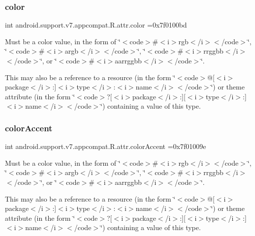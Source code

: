 \subsubsection{\texorpdfstring{color}{color}}
{\footnotesize\ttfamily int android.\+support.\+v7.\+appcompat.\+R.\+attr.\+color =0x7f0100bd\hspace{0.3cm}{\ttfamily [static]}}

Must be a color value, in the form of \char`\"{}$<$code$>$\#$<$i$>$rgb$<$/i$>$$<$/code$>$\char`\"{}, \char`\"{}$<$code$>$\#$<$i$>$argb$<$/i$>$$<$/code$>$\char`\"{}, \char`\"{}$<$code$>$\#$<$i$>$rrggbb$<$/i$>$$<$/code$>$\char`\"{}, or \char`\"{}$<$code$>$\#$<$i$>$aarrggbb$<$/i$>$$<$/code$>$\char`\"{}. 

This may also be a reference to a resource (in the form \char`\"{}$<$code$>$@\mbox{[}$<$i$>$package$<$/i$>$\+:\mbox{]}$<$i$>$type$<$/i$>$\+:$<$i$>$name$<$/i$>$$<$/code$>$\char`\"{}) or theme attribute (in the form \char`\"{}$<$code$>$?\mbox{[}$<$i$>$package$<$/i$>$\+:\mbox{]}\mbox{[}$<$i$>$type$<$/i$>$\+:\mbox{]}$<$i$>$name$<$/i$>$$<$/code$>$\char`\"{}) containing a value of this type. \mbox{\label{classandroid_1_1support_1_1v7_1_1appcompat_1_1R_1_1attr_a46fb9e9ac72cb8a9a5ec1f8677330f26}} 
\subsubsection{\texorpdfstring{color\+Accent}{colorAccent}}
{\footnotesize\ttfamily int android.\+support.\+v7.\+appcompat.\+R.\+attr.\+color\+Accent =0x7f01009e\hspace{0.3cm}{\ttfamily [static]}}

Must be a color value, in the form of \char`\"{}$<$code$>$\#$<$i$>$rgb$<$/i$>$$<$/code$>$\char`\"{}, \char`\"{}$<$code$>$\#$<$i$>$argb$<$/i$>$$<$/code$>$\char`\"{}, \char`\"{}$<$code$>$\#$<$i$>$rrggbb$<$/i$>$$<$/code$>$\char`\"{}, or \char`\"{}$<$code$>$\#$<$i$>$aarrggbb$<$/i$>$$<$/code$>$\char`\"{}. 

This may also be a reference to a resource (in the form \char`\"{}$<$code$>$@\mbox{[}$<$i$>$package$<$/i$>$\+:\mbox{]}$<$i$>$type$<$/i$>$\+:$<$i$>$name$<$/i$>$$<$/code$>$\char`\"{}) or theme attribute (in the form \char`\"{}$<$code$>$?\mbox{[}$<$i$>$package$<$/i$>$\+:\mbox{]}\mbox{[}$<$i$>$type$<$/i$>$\+:\mbox{]}$<$i$>$name$<$/i$>$$<$/code$>$\char`\"{}) containing a value of this type. \mbox{\label{classandroid_1_1support_1_1v7_1_1appcompat_1_1R_1_1attr_a8ff054167c209f5d016ea6c4c3ed9ddb}} 
